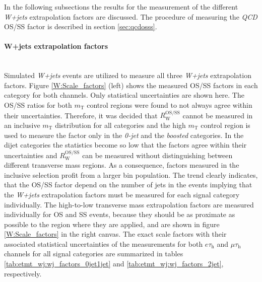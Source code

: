 In the following subsections the results for the measurement of the different \textit{W+jets} extrapolation factors are discussed. 
The procedure of measuring the \textit{QCD} OS/SS factor is described in section \ref{sec:qcdosss}. 

\paragraph{W+jets extrapolation factors}\mbox{}\\
Simulated \textit{W+jets} events are utilized to measure all three \textit{W+jets} extrapolation factors. 
Figure \ref{W:Scale_factors} (left) shows the measured OS/SS factors in each category for both channels. Only statistical uncertainties are shown here.
The OS/SS ratios for both $m_\text{T}$ control regions were found to not always agree within their uncertainties. 
Therefore, it was decided that $R_\text{W}^\text{OS/SS}$ cannot be measured in an inclusive $m_\text{T}$ distribution for all categories
and the high $m_\text{T}$ control region is used to measure the factor only in the \textit{0-jet} and the \textit{boosted} categories.
In the dijet categories the statistics become so low that the factors agree within their uncertainties and $R_\text{W}^\text{OS/SS}$ can be measured without distinguishing between different transverse mass regions. As a consequence, factors measured in the inclusive selection profit from a larger bin population. 
The trend clearly indicates, that the OS/SS factor depend on the number of jets in the events implying that the \textit{W+jets} extrapolation factors must be measured for each signal category individually.
The high-to-low transverse mass extrapolation factors are measured individually for OS and SS events, because they should be as proximate as possible to the region where they are applied,  and are shown in figure \ref{W:Scale_factors} in the right canvas.
The exact scale factors with their associated statistical uncertainties of the measurements for both $e\tau_\text{h}$ and $\mu\tau_\text{h}$ channels for all 
signal categories are summarized in tables \ref{tab:etmt_wj:wj_factors_0jet1jet} and \ref{tab:etmt_wj:wj_factors_2jet}, respectively.


